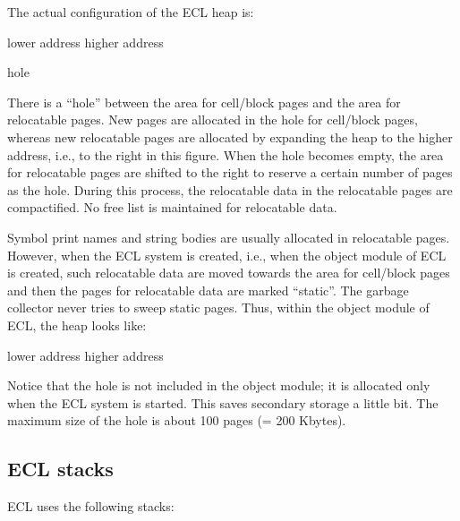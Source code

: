 The actual configuration of the ECL heap is:

\vspace{1 em}

\centerline{\code lower address \hspace*{3in}{}higher address}

\centerline{ {\code  hole} }

\vspace{1 em}

There is a ``hole'' between the area for cell/block pages
and the area for relocatable pages.  New pages are allocated in the
hole for cell/block pages, whereas new relocatable pages are
allocated by expanding the heap to the higher address, i.e., to the
right in this figure.  When the hole becomes empty, the area for
relocatable pages are shifted to the right to reserve a certain number
of pages as the hole.  During this process, the relocatable data in
the relocatable pages are compactified.  No free list is maintained
for relocatable data.

Symbol print names and string bodies are usually allocated
in relocatable pages.  However, when the ECL system is created, i.e.,
when the object module of ECL is created, such relocatable data are
moved towards the area for cell/block pages and then the pages for
relocatable data are marked ``static''.  The garbage collector never
tries to sweep static pages.  Thus, within the object module of ECL,
the heap looks like:

\vspace{1 em}

\centerline{\code lower address \hspace*{3in}{}higher address}

\centerline{}

\vspace{1 em}

Notice that the hole is not included in the object module;
it is allocated only when the ECL system is started.  This saves
secondary storage a little bit.  The maximum size of the hole is about
100 pages (= 200 Kbytes).

\subsection{ECL stacks}

ECL uses the following stacks:

